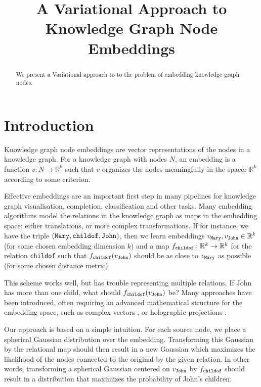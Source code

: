 \documentclass[11pt]{article}
\title{A Variational Approach to Knowledge Graph Node Embeddings}
\begin{document}
\newcommand{\R}{{\mathbb R}}
\newcommand{\fw}[1]{\text{\texttt{#1}}}

\maketitle

\begin{abstract}

	We present a Variational approach to to the problem of embedding knowledge graph nodes.
\end{abstract}	

\section{Introduction}
Knowledge graph node embeddings are vector representations of the nodes in a knowledge graph. For a knowledge graph with nodes $N$, an embedding is a function $v: N \to \R^k$ such that $v$ organizes the nodes meaningfully in the spacer $\R^k$ according to some criterion.

Effective embeddings are an important first step in many pipelines for knowledge graph visualisation, completion, classification and other tasks. Many embedding algorithms model the relations in the knowledge graph as maps in the embedding space: either translations, or more complex transformations. If for instance, we have the triple $(\fw{Mary}, \fw{childof}, \fw{John})$, then we learn embeddings $v_\fw{Mary}, v_\fw{John} \in \R^k$  (for some chosen embedding dimension $k$) and a map $f_\fw{childof} : \R^k \to \R^k$ for the relation \texttt{childof} such that $f_\fw{childof}(v_\fw{John})$ should be as close to $v_\fw{Mary}$ as possible (for some chosen distance metric).

This scheme works well, but has trouble representing multiple relations. If John has more than one child, what should $f_\fw{childof}(v_\fw{John})$ be? Many approaches have been introduced, often requiring an advanced mathematical structure for the embedding space, such as complex vectors \cite{trouillon2016complex}, or holographic projections \cite{nickel2016holographic}.

Our approach is based on a simple intuition. For each source node, we place a spherical Gaussian distribution over the embedding. Transforming this Gaussian by the relational map should then result in a new Gaussian which maximizes the likelihood of the nodes connected to the original by the given relation.\footnotemark
{} In other words, transforming a spherical Gaussian centered on $v_\fw{John}$ by $f_\fw{childof}$ should result in a distribution that maximizes the probability of John's children.
\end{document}
